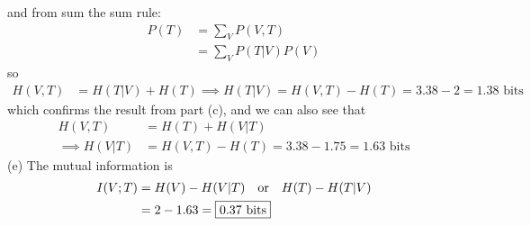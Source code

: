 \documentclass[../main.tex]{subfiles}
\begin{document}
and from sum the sum rule:
\begin{align*}
    P(T) &= \sum_V P(V,T) \\
    &= \sum_V P(T|V) P(V) 
\end{align*}
so
\begin{align*}
    H(V,T) &= H(T|V) + H(T) \implies H(T|V) = H(V,T) - H(T) = 3.38 - 2 = 1.38 \text{ bits}
\end{align*}
which confirms the result from part (c), and we can also see that
\begin{align*}
    H(V,T) &= H(T) + H(V|T) \\
\implies H(V|T) &= H(V,T) - H(T) = 3.38 - 1.75 = \boxed{1.63 \text{ bits}}
\end{align*}
(e) The mutual information is 
\begin{align*}
    I(V;T) &= H(V) - H(V|T) \qor H(T) - H(T|V) \\
    &= 2 - 1.63 = \boxed{0.37 \text{ bits}}
\end{align*}
\end{document}
